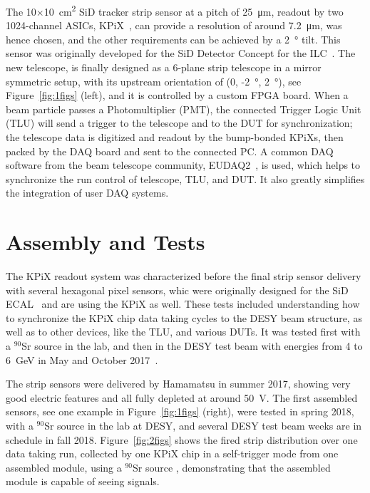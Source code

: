 The 10$\times$\SI{10}{\square\centi\metre} SiD tracker strip sensor at a pitch of \SI{25}{\micro\metre}, readout by two 1024-channel ASICs, KPiX~\cite{kpix}, can provide a resolution of around \SI{7.2}{\micro\metre},
was hence chosen, and the other requirements can be achieved by a \SI{2}{\degree} tilt. This sensor was originally developed for the SiD Detector Concept for the ILC~\cite{Behnke:2013lya}.
The new telescope, \lycoris is finally designed as a 6-plane strip telescope in a mirror symmetric setup, with its upstream orientation of (0, -\SI{2}{\degree}, \SI{2}{\degree}),
see Figure~\ref{fig:1figs} (left), and it is controlled by a custom FPGA board.
When a beam particle passes a Photomultiplier (PMT), the connected Trigger Logic Unit (TLU) will send a trigger to the telescope and to the DUT for synchronization;
the telescope data is digitized and readout by the bump-bonded KPiXs, then packed by the DAQ board and sent to the connected PC. A common DAQ software from the beam telescope
community, EUDAQ2~\cite{eudaq2}, is used, which helps to synchronize the run control of telescope, TLU, and DUT. It also greatly simplifies the integration of user DAQ systems.

\section*{Assembly and Tests}

The KPiX readout system was characterized before the final strip sensor delivery with several hexagonal pixel sensors, whic  were originally designed for the SiD ECAL~\cite{Behnke:2013lya}
and are using the KPiX as well. These tests included understanding how to synchronize the KPiX chip data taking cycles to the DESY beam structure, as well as to other devices, like the TLU, and various DUTs.
It was tested first with a $^{90}$Sr source in the lab, and then in the DESY test beam with energies from 4 to \SI{6}{\GeV} in May and October 2017~\cite{lycoris1}.

The strip sensors were delivered by Hamamatsu in summer 2017, showing very good electric features and all fully depleted at around \SI{50}{\volt}.
The first assembled sensors, see one example in Figure~\ref{fig:1figs} (right), were tested in spring 2018, with a $^{90}$Sr source in the lab at DESY, and several DESY test beam weeks are in schedule in fall 2018.
Figure~\ref{fig:2figs} shows the fired strip distribution over one data taking run, collected by one KPiX chip in a self-trigger mode from one assembled module, using a $^{90}$Sr source ,
demonstrating that the assembled module is capable of seeing signals.

